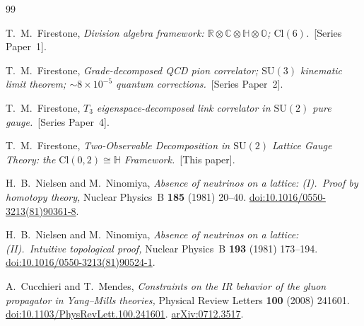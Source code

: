 \documentclass[12pt]{article}
\numberwithin{equation}{section}
\theoremstyle{plain}
\theoremstyle{definition}
\theoremstyle{remark}
\newcommand{\cl}{\mathrm{Cl}}              %
\newcommand{\su}{\mathrm{SU}}              %
\newcommand{\R}{\mathbb{R}}                %
\newcommand{\Cplx}{\mathbb{C}}             %
\newcommand{\HH}{\mathbb{H}}               %
\newcommand{\OO}{\mathbb{O}}               %
\newcommand{\Dix}{\R\otimes\Cplx\otimes\HH\otimes\OO}  %
\begin{document}
		\begin{thebibliography}{99}
			
			
			T.~M.\ Firestone, \emph{Division algebra framework: $\Dix$;
				$\cl(6)$.}~[Series Paper~1].
			
			T.~M.\ Firestone, \emph{Grade-decomposed QCD pion correlator;
				$\su(3)$ kinematic limit theorem;
				$\sim\!8\times 10^{-5}$ quantum corrections.}~[Series Paper~2].
			
			T.~M.\ Firestone, \emph{$T_3$ eigenspace-decomposed link correlator
				in $\su(2)$ pure gauge.}~[Series Paper~4].
			
			T.~M.\ Firestone, \emph{Two-Observable Decomposition in $\su(2)$
				Lattice Gauge Theory: the $\cl(0,2)\cong\HH$ Framework.}~[This paper].
			
			H.~B.\ Nielsen and M.\ Ninomiya,
			\emph{Absence of neutrinos on a lattice: (I).~Proof by homotopy
				theory,}
			Nuclear Physics~B \textbf{185} (1981) 20--40.
			\href{https://doi.org/10.1016/0550-3213(81)90361-8}%
			{doi:10.1016/0550-3213(81)90361-8}.
			
			H.~B.\ Nielsen and M.\ Ninomiya,
			\emph{Absence of neutrinos on a lattice: (II).~Intuitive
				topological proof,}
			Nuclear Physics~B \textbf{193} (1981) 173--194.
			\href{https://doi.org/10.1016/0550-3213(81)90524-1}%
			{doi:10.1016/0550-3213(81)90524-1}.
			
			A.\ Cucchieri and T.\ Mendes,
			\emph{Constraints on the IR behavior of the gluon propagator
				in Yang--Mills theories,}
			Physical Review Letters \textbf{100} (2008) 241601.
			\href{https://doi.org/10.1103/PhysRevLett.100.241601}%
			{doi:10.1103/PhysRevLett.100.241601}.
			\href{https://arxiv.org/abs/0712.3517}{arXiv:0712.3517}.
			

\end{thebibliography}
\end{document}
